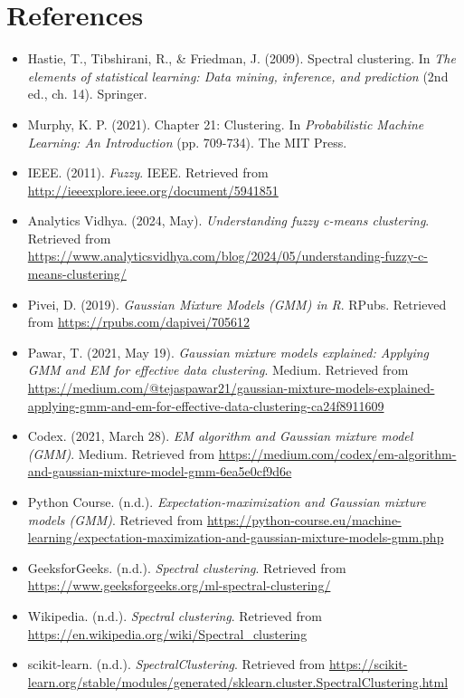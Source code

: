 \documentclass[11pt,a4paper]{article}
\begin{document}
\section{References}
\begin{itemize}
    \item Hastie, T., Tibshirani, R., \& Friedman, J. (2009). Spectral clustering. In \textit{The elements of statistical learning: Data mining, inference, and prediction} (2nd ed., ch. 14). Springer.
    \item Murphy, K. P. (2021). Chapter 21: Clustering. In \textit{Probabilistic Machine Learning: An Introduction} (pp. 709-734). The MIT Press.
    \item IEEE. (2011). \textit{Fuzzy}. IEEE. Retrieved from \url{http://ieeexplore.ieee.org/document/5941851}
    \item Analytics Vidhya. (2024, May). \textit{Understanding fuzzy c-means clustering}. Retrieved from \url{https://www.analyticsvidhya.com/blog/2024/05/understanding-fuzzy-c-means-clustering/}
    \item Pivei, D. (2019). \textit{Gaussian Mixture Models (GMM) in R}. RPubs. Retrieved from \url{https://rpubs.com/dapivei/705612}
    \item Pawar, T. (2021, May 19). \textit{Gaussian mixture models explained: Applying GMM and EM for effective data clustering}. Medium. Retrieved from \url{https://medium.com/@tejaspawar21/gaussian-mixture-models-explained-applying-gmm-and-em-for-effective-data-clustering-ca24f8911609}
    \item Codex. (2021, March 28). \textit{EM algorithm and Gaussian mixture model (GMM)}. Medium. Retrieved from \url{https://medium.com/codex/em-algorithm-and-gaussian-mixture-model-gmm-6ea5e0cf9d6e}
    \item Python Course. (n.d.). \textit{Expectation-maximization and Gaussian mixture models (GMM)}. Retrieved from \url{https://python-course.eu/machine-learning/expectation-maximization-and-gaussian-mixture-models-gmm.php}
    \item GeeksforGeeks. (n.d.). \textit{Spectral clustering}. Retrieved from \url{https://www.geeksforgeeks.org/ml-spectral-clustering/}
    \item Wikipedia. (n.d.). \textit{Spectral clustering}. Retrieved from \url{https://en.wikipedia.org/wiki/Spectral_clustering}
    \item scikit-learn. (n.d.). \textit{SpectralClustering}. Retrieved from \url{https://scikit-learn.org/stable/modules/generated/sklearn.cluster.SpectralClustering.html}

\end{itemize}
\end{document}
